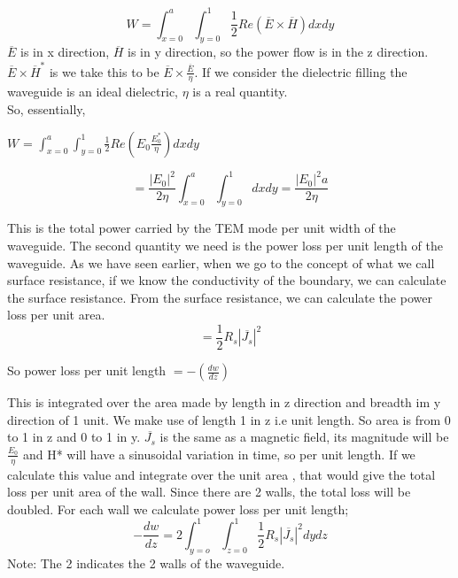 \begin{equation}
W=\int_{x=0}^{a}\int_{y=0}^{1} \frac{1}{2}Re{(\overline{E} \times \overline{H})dxdy}	
\end{equation}
$\overline{E}$ is in x direction, $\overline{H}$ is in y direction, so the power flow is in the z direction. $\overline{E} \times \overline{H}^*$ is we take this to be $\overline{E} \times \frac{\overline{E}}{\eta}$. If we consider the dielectric filling the waveguide is an ideal dielectric, $\eta$ is a real quantity. \\
So, essentially,

\begin{center}
$W$ = $\int_{x=0}^{a}\int_{y=0}^{1}\frac{1}{2}Re(E_0 \frac{E_0^*}{\eta})dxdy$

\end{center}
\begin{equation}
= \frac{\left|E_{0}\right|^2}{2\eta}\int_{x=0}^{a}\int_{y=0}^{1}dxdy = \frac{|E_0|^2a}{2\eta}
\end{equation}


This is the total power carried by the TEM mode per unit width of the waveguide. The second quantity we need is the power loss per unit length of the waveguide. As we have seen earlier, when we go to the concept of what we call surface resistance, if we know the conductivity of the boundary, we can calculate the surface resistance. From the surface resistance, we can calculate the power loss per unit area.
\begin{equation}
=\frac{1}{2}R_s|\overline{J_s}|^2 
\end{equation}

So power loss per unit length 
$ =-(\frac{dw}{dz}) $

This is integrated over the area made by length in z direction and breadth im y direction of 1  unit. We make use of length 1 in z i.e unit length. So area is from 0 to 1 in z and 0 to 1 in y. $ \overline{J_s} $ is the same as a magnetic field, its magnitude will be $ \frac{E_0}{\eta} $ and H* will have a sinusoidal variation in time, so per unit length. If we calculate this value and integrate over the unit area 
, that would give the total loss per unit area of the wall. Since there are 2 walls, the total loss will be doubled. For each wall we calculate
power loss per unit length; 
\begin{equation}
-\frac{dw}{dz}= 2 \int_{y=o}^{1} \int_{z=0}^{1}\frac{1}{2}R_s|\overline{J_s}|^2dydz
\end{equation}
Note: The 2 indicates the 2 walls of the waveguide. 

